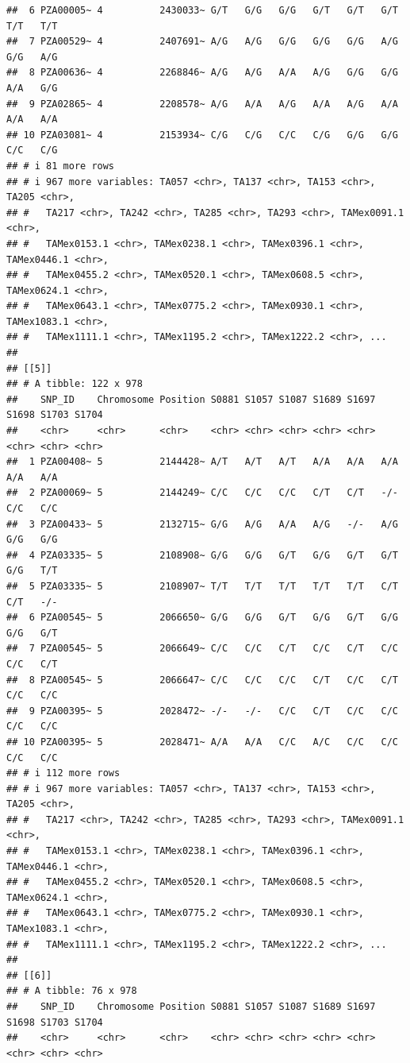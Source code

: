 \documentclass[
]{article}
\begin{document}
\begin{verbatim}
##  6 PZA00005~ 4          2430033~ G/T   G/G   G/G   G/T   G/T   G/T   T/T   T/T  
##  7 PZA00529~ 4          2407691~ A/G   A/G   G/G   G/G   G/G   A/G   G/G   A/G  
##  8 PZA00636~ 4          2268846~ A/G   A/G   A/A   A/G   G/G   G/G   A/A   G/G  
##  9 PZA02865~ 4          2208578~ A/G   A/A   A/G   A/A   A/G   A/A   A/A   A/A  
## 10 PZA03081~ 4          2153934~ C/G   C/G   C/C   C/G   G/G   G/G   C/C   C/G  
## # i 81 more rows
## # i 967 more variables: TA057 <chr>, TA137 <chr>, TA153 <chr>, TA205 <chr>,
## #   TA217 <chr>, TA242 <chr>, TA285 <chr>, TA293 <chr>, TAMex0091.1 <chr>,
## #   TAMex0153.1 <chr>, TAMex0238.1 <chr>, TAMex0396.1 <chr>, TAMex0446.1 <chr>,
## #   TAMex0455.2 <chr>, TAMex0520.1 <chr>, TAMex0608.5 <chr>, TAMex0624.1 <chr>,
## #   TAMex0643.1 <chr>, TAMex0775.2 <chr>, TAMex0930.1 <chr>, TAMex1083.1 <chr>,
## #   TAMex1111.1 <chr>, TAMex1195.2 <chr>, TAMex1222.2 <chr>, ...
## 
## [[5]]
## # A tibble: 122 x 978
##    SNP_ID    Chromosome Position S0881 S1057 S1087 S1689 S1697 S1698 S1703 S1704
##    <chr>     <chr>      <chr>    <chr> <chr> <chr> <chr> <chr> <chr> <chr> <chr>
##  1 PZA00408~ 5          2144428~ A/T   A/T   A/T   A/A   A/A   A/A   A/A   A/A  
##  2 PZA00069~ 5          2144249~ C/C   C/C   C/C   C/T   C/T   -/-   C/C   C/C  
##  3 PZA00433~ 5          2132715~ G/G   A/G   A/A   A/G   -/-   A/G   G/G   G/G  
##  4 PZA03335~ 5          2108908~ G/G   G/G   G/T   G/G   G/T   G/T   G/G   T/T  
##  5 PZA03335~ 5          2108907~ T/T   T/T   T/T   T/T   T/T   C/T   C/T   -/-  
##  6 PZA00545~ 5          2066650~ G/G   G/G   G/T   G/G   G/T   G/G   G/G   G/T  
##  7 PZA00545~ 5          2066649~ C/C   C/C   C/T   C/C   C/T   C/C   C/C   C/T  
##  8 PZA00545~ 5          2066647~ C/C   C/C   C/C   C/T   C/C   C/T   C/C   C/C  
##  9 PZA00395~ 5          2028472~ -/-   -/-   C/C   C/T   C/C   C/C   C/C   C/C  
## 10 PZA00395~ 5          2028471~ A/A   A/A   C/C   A/C   C/C   C/C   C/C   C/C  
## # i 112 more rows
## # i 967 more variables: TA057 <chr>, TA137 <chr>, TA153 <chr>, TA205 <chr>,
## #   TA217 <chr>, TA242 <chr>, TA285 <chr>, TA293 <chr>, TAMex0091.1 <chr>,
## #   TAMex0153.1 <chr>, TAMex0238.1 <chr>, TAMex0396.1 <chr>, TAMex0446.1 <chr>,
## #   TAMex0455.2 <chr>, TAMex0520.1 <chr>, TAMex0608.5 <chr>, TAMex0624.1 <chr>,
## #   TAMex0643.1 <chr>, TAMex0775.2 <chr>, TAMex0930.1 <chr>, TAMex1083.1 <chr>,
## #   TAMex1111.1 <chr>, TAMex1195.2 <chr>, TAMex1222.2 <chr>, ...
## 
## [[6]]
## # A tibble: 76 x 978
##    SNP_ID    Chromosome Position S0881 S1057 S1087 S1689 S1697 S1698 S1703 S1704
##    <chr>     <chr>      <chr>    <chr> <chr> <chr> <chr> <chr> <chr> <chr> <chr>

\end{verbatim}
\end{document}
